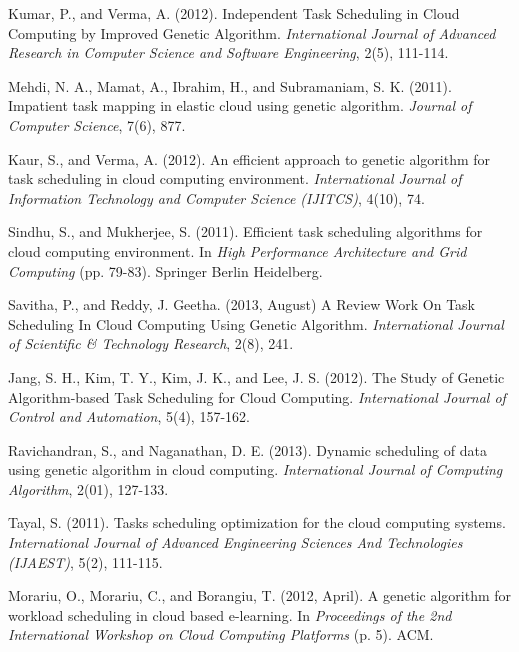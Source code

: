 \documentclass[10pt,twoside,openright,logo]{report}
\begin{document}
\begin{thebibliography}{99} %

 Kumar, P., and Verma, A. (2012).
\newblock Independent Task Scheduling in Cloud Computing by Improved Genetic Algorithm.
\newblock \emph{International Journal of Advanced Research in Computer Science and Software Engineering}, 2(5), 111-114.

 Mehdi, N. A., Mamat, A., Ibrahim, H., and Subramaniam, S. K. (2011).
\newblock Impatient task mapping in elastic cloud using genetic algorithm.
\newblock \emph{Journal of Computer Science}, 7(6), 877.

 Kaur, S., and Verma, A. (2012).
\newblock An efficient approach to genetic algorithm for task scheduling in cloud computing environment.
\newblock \emph{International Journal of Information Technology and Computer Science (IJITCS)}, 4(10), 74.

 Sindhu, S., and Mukherjee, S. (2011).
\newblock Efficient task scheduling algorithms for cloud computing environment.
\newblock In \emph{High Performance Architecture and Grid Computing} (pp. 79-83). Springer Berlin Heidelberg.

 Savitha, P., and Reddy, J. Geetha. (2013, August)
\newblock A Review Work On Task Scheduling In Cloud Computing Using Genetic Algorithm.
\newblock \emph{International Journal of Scientific \& Technology Research}, 2(8), 241.

 Jang, S. H., Kim, T. Y., Kim, J. K., and Lee, J. S. (2012).
\newblock The Study of Genetic Algorithm-based Task Scheduling for Cloud Computing.
\newblock \emph{International Journal of Control and Automation}, 5(4), 157-162.

 Ravichandran, S., and Naganathan, D. E. (2013).
\newblock Dynamic scheduling of data using genetic algorithm in cloud computing.
\newblock \emph{International Journal of Computing Algorithm}, 2(01), 127-133.

 Tayal, S. (2011).
\newblock Tasks scheduling optimization for the cloud computing systems.
\newblock \emph{International Journal of Advanced Engineering Sciences And Technologies (IJAEST)}, 5(2), 111-115.

 Morariu, O., Morariu, C., and Borangiu, T. (2012, April).
\newblock A genetic algorithm for workload scheduling in cloud based e-learning.
\newblock In \emph{Proceedings of the 2nd International Workshop on Cloud Computing Platforms} (p. 5). ACM.


\end{thebibliography}
\end{document}
